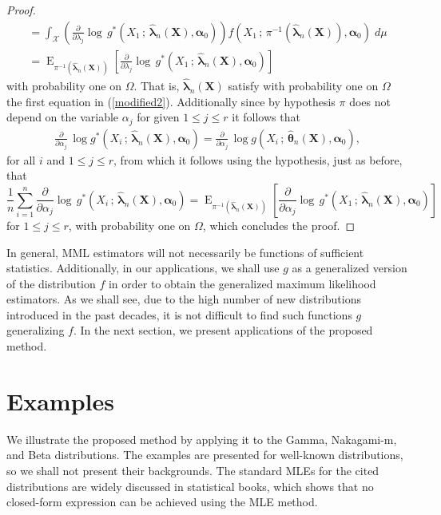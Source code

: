 \documentclass[10pt,a4paper,onecolumn]{article} %
\newcommand{\bs}{\boldsymbol}
\newcommand{\on}{\operatorname}
\begin{document}
\begin{proof}
\begin{equation*}
\begin{aligned}
= \int_{\mathcal{X}}\left(\frac{\partial}{\partial \lambda_j}  \log\, g^*(X_1\,;\, \bs{\hat{\lambda}}_n(\bs{X}),\bs{\alpha}_0)\right)f(X_1\,;\,\pi^{-1}(\bs{\hat{\lambda}}_n(\bs{X})),\bs{\alpha}_0)\; d\mu\\
=\on{E}_{\pi^{-1}(\bs{\hat{\lambda}}_n(\bs{X}))}\left[\frac{\partial}{\partial \lambda_j}  \log\, g^*(X_1\,;\,\bs{\hat{\lambda}}_n(\bs{X}),\bs{\alpha}_0)\right]
\end{aligned}
\end{equation*}
with probability one on $\Omega$. That is, $\bs{\hat{\lambda}}_n(\bs{X})$ satisfy with probability one on $\Omega$ the first equation in (\ref{modified2}).
Additionally since by hypothesis $\pi$ does not depend on the variable $\alpha_j$ for given $1\leq j\leq r$ it follows that
\begin{equation*}
\begin{aligned}
\frac{\partial}{\partial \alpha_j}\, \log g^*(X_i\,;\,\bs{\hat{\lambda}}_n(\bs{X}),\bs{\alpha}_0)  =  \frac{\partial}{\partial \alpha_j}\, \log g(X_i\,;\,\bs{\hat{\theta}}_n(\bs{X}),\bs{\alpha}_0),
\end{aligned}
\end{equation*}
for all $i$ and $1\leq j\leq r$, from which it follows using the hypothesis, just as before, that
\begin{equation*}
\frac{1}{n}
\sum_{i=1}^n \frac{\partial}{\partial \alpha_j}  \log\, g^*(X_i\,;\,\bs{\hat{\lambda}}_n(\bs{X}),\bs{\alpha}_0)=\on{E}_{\pi^{-1}(\bs{\hat{\lambda}}_n(\bs{X}))}\left[\frac{\partial}{\partial \alpha_j}  \log\, g^*(X_1\,;\,\bs{\hat{\lambda}}_n(\bs{X}),\bs{\alpha}_0)\right]
\end{equation*}
for $1\leq j\leq r$, with probability one on $\Omega$, which concludes the proof.
\end{proof}
In general, MML estimators will not necessarily be functions of sufficient statistics. Additionally, in our applications, we shall use $g$ as a generalized version of the distribution $f$ in order to obtain the generalized maximum likelihood estimators. As we shall see, due to the high number of new distributions introduced in the past decades, it is not difficult to find such functions $g$ generalizing $f$. In the next section, we present applications of the proposed method.


\section{Examples}


We illustrate the proposed method by applying it to the Gamma, Nakagami-m, and Beta distributions. The examples are presented for well-known distributions, so we shall not present their backgrounds. The standard MLEs for the cited distributions are widely discussed in statistical books, which shows that no closed-form expression can be achieved using the MLE method.
\end{document}
